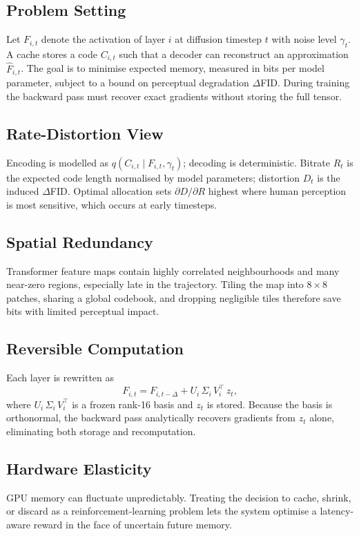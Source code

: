 \documentclass{article}
\begin{document}
\subsection{Problem Setting}
Let $F_{i,t}$ denote the activation of layer $i$ at diffusion timestep $t$ with noise level $\gamma_t$. A cache stores a code $C_{i,t}$ such that a decoder can reconstruct an approximation $\hat F_{i,t}$. The goal is to minimise expected memory, measured in bits per model parameter, subject to a bound on perceptual degradation $\Delta$FID. During training the backward pass must recover exact gradients without storing the full tensor.

\subsection{Rate-Distortion View}
Encoding is modelled as $q(C_{i,t}\mid F_{i,t},\gamma_t)$; decoding is deterministic. Bitrate $R_t$ is the expected code length normalised by model parameters; distortion $D_t$ is the induced $\Delta$FID. Optimal allocation sets $\partial D/\partial R$ highest where human perception is most sensitive, which occurs at early timesteps.

\subsection{Spatial Redundancy}
Transformer feature maps contain highly correlated neighbourhoods and many near-zero regions, especially late in the trajectory. Tiling the map into $8\times8$ patches, sharing a global codebook, and dropping negligible tiles therefore save bits with limited perceptual impact.

\subsection{Reversible Computation}
Each layer is rewritten as
\[
F_{i,t} = F_{i,t-\Delta} + U_i\,\Sigma_i\,V_i^{\top}\, z_t,
\]
where $U_i\,\Sigma_i\,V_i^{\top}$ is a frozen rank-16 basis and $z_t$ is stored. Because the basis is orthonormal, the backward pass analytically recovers gradients from $z_t$ alone, eliminating both storage and recomputation.

\subsection{Hardware Elasticity}
GPU memory can fluctuate unpredictably. Treating the decision to cache, shrink, or discard as a reinforcement-learning problem lets the system optimise a latency-aware reward in the face of uncertain future memory.
\end{document}
